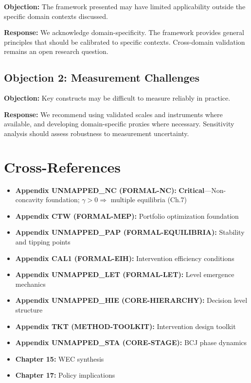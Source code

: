 \textbf{Objection:} The framework presented may have limited applicability
outside the specific domain contexts discussed.

\textbf{Response:} We acknowledge domain-specificity. The framework provides
general principles that should be calibrated to specific contexts. Cross-domain
validation remains an open research question.

\subsection{Objection 2: Measurement Challenges}

\textbf{Objection:} Key constructs may be difficult to measure reliably in
practice.

\textbf{Response:} We recommend using validated scales and instruments where
available, and developing domain-specific proxies where necessary. Sensitivity
analysis should assess robustness to measurement uncertainty.


\section{Cross-References}

\nocite{bcm_master}

\label{sec:meq-crossref}

\begin{itemize}[nosep]
    \item \textbf{Appendix UNMAPPED_NC (FORMAL-NC):} \textbf{Critical}---Non-concavity foundation; $\gamma > 0 \Rightarrow$ multiple equilibria (Ch.7)
    \item \textbf{Appendix CTW (FORMAL-MEP):} Portfolio optimization foundation
    \item \textbf{Appendix UNMAPPED_PAP (FORMAL-EQUILIBRIA):} Stability and tipping points
    \item \textbf{Appendix CAL1 (FORMAL-EIH):} Intervention efficiency conditions
    \item \textbf{Appendix UNMAPPED_LET (FORMAL-LET):} Level emergence mechanics
    \item \textbf{Appendix UNMAPPED_HIE (CORE-HIERARCHY):} Decision level structure
    \item \textbf{Appendix TKT (METHOD-TOOLKIT):} Intervention design toolkit
    \item \textbf{Appendix UNMAPPED_STA (CORE-STAGE):} BCJ phase dynamics
    \item \textbf{Chapter 15:} WEC synthesis
    \item \textbf{Chapter 17:} Policy implications
\end{itemize}

